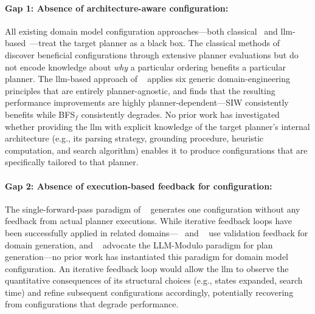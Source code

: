 \paragraph{Gap 1: Absence of architecture-aware configuration:}
All existing domain model configuration approaches---both classical~\cite{Vallati2015, Vallati2021} and \gls{llm}-based~\cite{Elis2025, Georgievski2025}---treat the target planner as a black box.
The classical methods of \citeauthor{Vallati2015} discover beneficial configurations through extensive planner evaluations but do not encode knowledge about \emph{why} a particular ordering benefits a particular planner.
The \gls{llm}-based approach of \citeauthor{Georgievski2025}~\cite{Georgievski2025} applies six generic domain-engineering principles that are entirely planner-agnostic, and finds that the resulting performance improvements are highly planner-dependent---SIW consistently benefits while BFS$_f$ consistently degrades.
No prior work has investigated whether providing the \gls{llm} with explicit knowledge of the target planner's internal architecture (e.g., its parsing strategy, grounding procedure, heuristic computation, and search algorithm) enables it to produce configurations that are specifically tailored to that planner.

\paragraph{Gap 2: Absence of execution-based feedback for configuration:}
The single-forward-pass paradigm of \citeauthor{Georgievski2025}~\cite{Georgievski2025} generates one configuration without any feedback from actual planner executions.
While iterative feedback loops have been successfully applied in related domains---\citeauthor{Guan2023}~\cite{Guan2023} and \citeauthor{Oswald2024}~\cite{Oswald2024} use validation feedback for domain generation, and \citeauthor{Kambhampati2024}~\cite{Kambhampati2024} advocate the LLM-Modulo paradigm for plan generation---no prior work has instantiated this paradigm for domain model configuration.
An iterative feedback loop would allow the \gls{llm} to observe the quantitative consequences of its structural choices (e.g., states expanded, search time) and refine subsequent configurations accordingly, potentially recovering from configurations that degrade performance.


